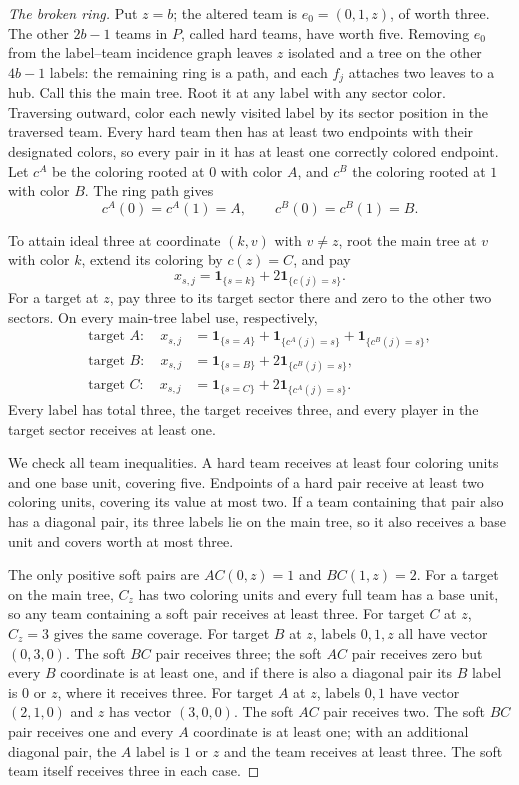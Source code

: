 \documentclass[11pt]{article}
\theoremstyle{remark}
\newcommand{\one}{\mathbf 1}
\begin{document}
\begin{proof}[The broken ring]
Put $z=b$; the altered team is $e_0=(0,1,z)$, of worth three.
The other $2b-1$ teams in $P$, called hard teams, have worth five.
Removing $e_0$ from the label--team incidence graph leaves $z$ isolated
and a tree on the other $4b-1$ labels: the remaining ring is a path,
and each $f_j$ attaches two leaves to a hub. Call this the main tree.
Root it at any label with any sector color. Traversing outward, color
each newly visited label by its sector position in the traversed team.
Every hard team then has at least two endpoints with their designated
colors, so every pair in it has at least one correctly colored endpoint.
Let $c^A$ be the coloring rooted at $0$ with color $A$, and $c^B$
the coloring rooted at $1$ with color $B$. The ring path gives
\[
                c^A(0)=c^A(1)=A,\qquad c^B(0)=c^B(1)=B.
\]

To attain ideal three at coordinate $(k,v)$ with $v\ne z$, root the
main tree at $v$ with color $k$, extend its coloring by $c(z)=C$,
and pay
\[
                        x_{s,j}=\one_{\{s=k\}}+2\one_{\{c(j)=s\}}.
\]
For a target at $z$, pay three to its target sector there and zero to
the other two sectors. On every main-tree label use, respectively,
\begin{align*}
 \text{target }A:\quad x_{s,j}&=\one_{\{s=A\}}
                         +\one_{\{c^A(j)=s\}}+\one_{\{c^B(j)=s\}},\\
 \text{target }B:\quad x_{s,j}&=\one_{\{s=B\}}+2\one_{\{c^B(j)=s\}},\\
 \text{target }C:\quad x_{s,j}&=\one_{\{s=C\}}+2\one_{\{c^A(j)=s\}}.
\end{align*}
Every label has total three, the target receives three, and every player
in the target sector receives at least one.

We check all team inequalities. A hard team receives at least four
coloring units and one base unit, covering five. Endpoints of a hard
pair receive at least two coloring units, covering its value at most
two. If a team containing that pair also has a diagonal pair, its three
labels lie on the main tree, so it also receives a base unit and covers
worth at most three.

The only positive soft pairs are $AC(0,z)=1$ and $BC(1,z)=2$.
For a target on the main tree, $C_z$ has two coloring units and every
full team has a base unit, so any team containing a soft pair receives
at least three. For target $C$ at $z$, $C_z=3$ gives the same coverage.
For target $B$ at $z$, labels $0,1,z$ all have vector $(0,3,0)$.
The soft $BC$ pair receives three; the soft $AC$ pair receives zero
but every $B$ coordinate is at least one, and if there is also a diagonal
pair its $B$ label is $0$ or $z$, where it receives three. For target
$A$ at $z$, labels $0,1$ have vector $(2,1,0)$ and $z$ has vector
$(3,0,0)$. The soft $AC$ pair receives two. The soft $BC$ pair
receives one and every $A$ coordinate is at least one; with an additional
diagonal pair, the $A$ label is $1$ or $z$ and the team receives at
least three. The soft team itself receives three in each case.


\end{proof}
\end{document}
